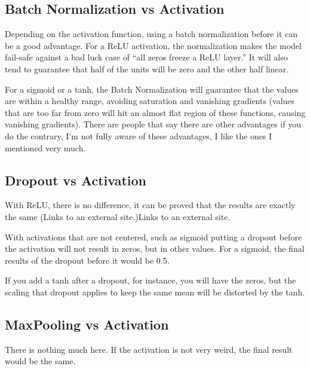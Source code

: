 	\subsection{Batch Normalization vs Activation}
Depending on the activation function, using a batch normalization before it can be a good advantage.
For a ReLU activation, the normalization makes the model fail-safe against a bad luck case of ``all zeros freeze a ReLU layer.''  It will also tend to guarantee that half of the units will be zero and the other half linear.

For a sigmoid or a tanh, the Batch Normalization will guarantee that the values are within a healthy range, avoiding saturation and vanishing gradients (values that are too far from zero will hit an almost flat region of these functions, causing vanishing gradients).
There are people that say there are other advantages if you do the contrary, I'm not fully aware of these advantages, I like the ones I mentioned very much.

	\subsection{Dropout vs Activation}
With ReLU, there is no difference, it can be proved that the results are exactly the same (Links to an external site.)Links to an external site.

With activations that are not centered, such as sigmoid putting a dropout before the activation will not result in zeros, but in other values.  For a sigmoid, the final results of the dropout before it would be 0.5.

If you add a tanh after a dropout, for instance, you will have the zeros, but the scaling that dropout applies to keep the same mean will be distorted by the tanh.

	\subsection{MaxPooling vs Activation}
There is nothing much here. If the activation is not very weird, the final result would be the same.


